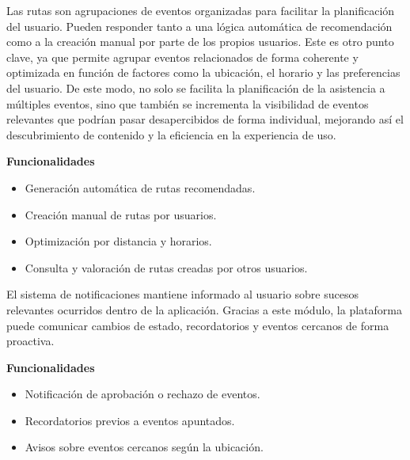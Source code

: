 \begin{tcolorbox}[title=\textbf{Rutas}]
Las rutas son agrupaciones de eventos organizadas para facilitar la planificación del usuario. Pueden responder tanto a una lógica automática de recomendación como a la creación manual por parte de los propios usuarios. Este es otro punto clave, ya que permite agrupar eventos relacionados de forma coherente y optimizada en función de factores como la ubicación, el horario y las preferencias del usuario. De este modo, no solo se facilita la planificación de la asistencia a múltiples eventos, sino que también se incrementa la visibilidad de eventos relevantes que podrían pasar desapercibidos de forma individual, mejorando así el descubrimiento de contenido y la eficiencia en la experiencia de uso.

\vspace{0.4em}
\textbf{Funcionalidades}
\begin{itemize}[leftmargin=1.5em]
\item Generación automática de rutas recomendadas.
\item Creación manual de rutas por usuarios.
\item Optimización por distancia y horarios.
\item Consulta y valoración de rutas creadas por otros usuarios.
\end{itemize}
\end{tcolorbox}

\begin{tcolorbox}[title=\textbf{Notificaciones}]
El sistema de notificaciones mantiene informado al usuario sobre sucesos relevantes ocurridos dentro de la aplicación. Gracias a este módulo, la plataforma puede comunicar cambios de estado, recordatorios y eventos cercanos de forma proactiva.

\vspace{0.4em}
\textbf{Funcionalidades}
\begin{itemize}[leftmargin=1.5em]
\item Notificación de aprobación o rechazo de eventos.
\item Recordatorios previos a eventos apuntados.
\item Avisos sobre eventos cercanos según la ubicación.
\end{itemize}
\end{tcolorbox}

